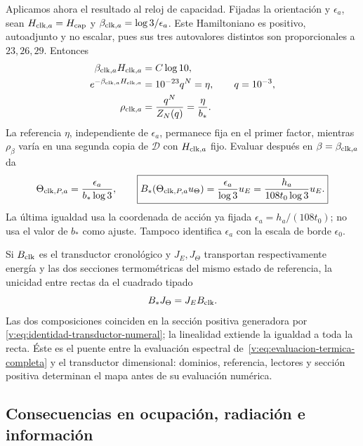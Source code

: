 Aplicamos ahora el resultado al reloj de capacidad. Fijadas la orientación
y $\epsilon_a$, sean $H_{{\rm clk},a}=H_{\rm cap}$ y
$\beta_{{\rm clk},a}=\log3/\epsilon_a$. Este Hamiltoniano es positivo,
autoadjunto y no escalar, pues sus tres autovalores distintos son
proporcionales a $23,26,29$. Entonces
\begin{align}
 \beta_{{\rm clk},a}H_{{\rm clk},a}
   &=C\log10,\nonumber\\
 e^{-\beta_{{\rm clk},a}H_{{\rm clk},a}}
   &=10^{-23}q^N=\eta,\qquad q=10^{-3},\nonumber\\
 \rho_{{\rm clk},a}
   &=\frac{q^N}{Z_N(q)}=\frac{\eta}{b_*}.
 \label{v:eq:estado-reloj-capacidad}
\end{align}
La referencia $\eta$, independiente de $\epsilon_a$, permanece fija en el
primer factor, mientras $\rho_\beta$ varía en una segunda copia de
$\mathcal D$ con $H_{{\rm clk},a}$ fijo. Evaluar después en
$\beta=\beta_{{\rm clk},a}$ da
\begin{equation}
 \Theta_{{\rm clk},P,a}=\frac{\epsilon_a}{b_*\log3},
 \qquad
 \boxed{B_*(\Theta_{{\rm clk},P,a}u_\Theta)
 =\frac{\epsilon_a}{\log3}u_E
 =\frac{h_a}{108t_0\log3}u_E.}
 \label{v:eq:identidad-transductor-numeral}
\end{equation}
La última igualdad usa la coordenada de acción ya fijada
$\epsilon_a=h_a/(108t_0)$; no usa el valor de $b_*$ como ajuste. Tampoco
identifica $\epsilon_a$ con la escala de borde $\epsilon_0$.

Si $B_{\rm clk}$ es el transductor cronológico y $J_E,J_\Theta$ transportan
respectivamente energía y las dos secciones termométricas del mismo estado
de referencia, la unicidad entre rectas da el cuadrado tipado
\begin{equation}
 B_*J_\Theta=J_EB_{\rm clk}.
 \label{v:eq:cuadrado-transductor-marcado}
\end{equation}
Las dos composiciones coinciden en la sección positiva generadora por
\eqref{v:eq:identidad-transductor-numeral}; la linealidad extiende la
igualdad a toda la recta. Éste es el puente entre la evaluación espectral
de~\eqref{v:eq:evaluacion-termica-completa} y el transductor dimensional:
dominios, referencia, lectores y sección positiva determinan el mapa antes
de su evaluación numérica.

\subsection{Consecuencias en ocupación, radiación e información}

